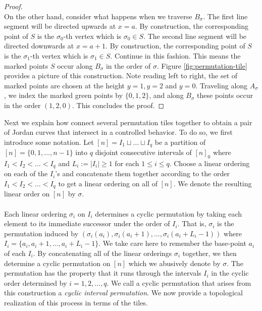 \documentclass[11pt,a4paper]{amsart}
\theoremstyle{definition}
\theoremstyle{remark}
\begin{document}
\begin{proof}
\\
On the other hand, consider what happens when we traverse $B_{\sigma}$.  The first line segment will be directed upwards at $x = a$.  By construction, the corresponding point of $S$ is the $\sigma_{0}$-th vertex which is $\sigma_{0} \in S$.  The second line segment will be directed downwards at $x = a+1$.  By construction, the corresponding point of $S$ is the $\sigma_{1}$-th vertex which is $\sigma_{1} \in S$.  Continue in this fashion.  This means the marked points $S$ occur along $B_{\sigma}$ in the order of $\sigma$.  Figure \ref{fig:permutation-tile} provides a picture of this construction.  Note reading left to right, the set of marked points are chosen at the height $y = 1, y= 2$ and $y = 0$.  Traveling along $A_{\sigma}$, we index the marked green points by $\{0,1,2\}$, and along $B_{\sigma}$ these points occur in the order $(1,2,0)$.  This concludes the proof.
\end{proof}

Next we explain how connect several permutation tiles together to obtain a pair of Jordan curves that intersect in a controlled behavior.  To do so, we first introduce some notation.  Let $[n] = I_{1} \sqcup \hdots \sqcup I_{q}$ be a partition of $[n] = \{0,1,\hdots, n-1\}$ into $q$ disjoint consecutive intervals of $[n]_{0}$ where $I_{1} < I_{2} < \hdots < I_{q}$ and $L_{i} := |I_{i}| \geq 1$ for each $1 \leq i \leq q$.  Choose a linear ordering on each of the $I_{i}$'s and concatenate them together according to the order $I_{1} <  I_{2} < \hdots < I_{q}$ to get a linear ordering on all of $[n]$.  We denote the resulting linear order on $[n]$ by $\sigma$.  \\
\\
Each linear ordering $\sigma_{i}$ on $I_{i}$ determines a cyclic permutation by taking each element to its immediate successor under the order of $I_{i}$.  That is, $\sigma_{i}$ is the permutation induced by $(\sigma_{i}(a_{i}), \sigma_{i}(a_{i}+1) , \hdots ,\sigma_{i}(a_{i}+L_{i}-1))$ where $I_{i} = \{a_{i},a_{i}+1,\hdots, a_{i}+L_{i}-1\}$.  We take care here to remember the base-point $a_{i}$ of each $I_{i}$.  By concatenating all of the linear orderings $\sigma_{i}$ together, we then determine a cyclic permutation on $[n]$ which we abusively denote by $\sigma$.  The permutation has the property that it runs through the intervals $I_{i}$ in the cyclic order determined by $i = 1, 2, \hdots, q$.  We call a cyclic permutation that arises from this construction a \emph{cyclic interval permutation}.  We now provide a topological realization of this process in terms of the tiles.   
\end{document}
